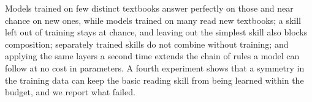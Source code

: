 Models trained on few distinct textbooks answer perfectly on those and near chance on new ones, while models trained on many read new textbooks; a skill left out of training stays at chance, and leaving out the simplest skill also blocks composition; separately trained skills do not combine without training; and applying the same layers a second time extends the chain of rules a model can follow at no cost in parameters. A fourth experiment shows that a symmetry in the training data can keep the basic reading skill from being learned within the budget, and we report what failed.
